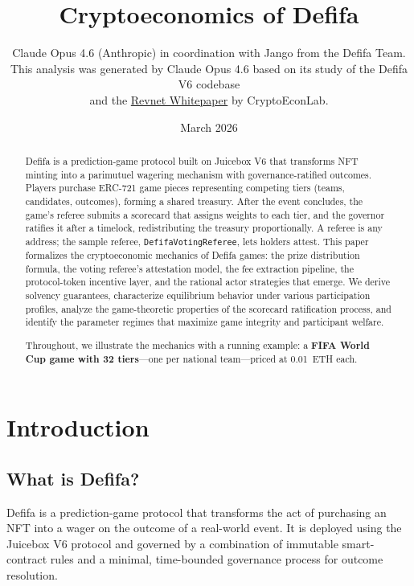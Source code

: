 \documentclass[11pt,a4paper]{article}
\title{\textbf{Cryptoeconomics of Defifa}}
\author{Claude Opus 4.6 (Anthropic) in coordination with Jango from the Defifa Team.\\[4pt]
\small This analysis was generated by Claude Opus 4.6 based on its study of the Defifa V6 codebase\\
\small and the \href{https://cryptoeconlab.com/paper/pub-0?paper=https\%253A\%252F\%252Fstorage.googleapis.com\%252Fcel-public-resources\%252FRevnet-Whitepaper.pdf}{Revnet Whitepaper} by CryptoEconLab.}
\date{March 2026}
\begin{document}
\maketitle

\begin{abstract}
Defifa is a prediction-game protocol built on Juicebox V6 that transforms NFT minting into a parimutuel wagering mechanism with governance-ratified outcomes. Players purchase ERC-721 game pieces representing competing tiers (teams, candidates, outcomes), forming a shared treasury. After the event concludes, the game's referee submits a scorecard that assigns weights to each tier, and the governor ratifies it after a timelock, redistributing the treasury proportionally. A referee is any address; the sample referee, \texttt{DefifaVotingReferee}, lets holders attest. This paper formalizes the cryptoeconomic mechanics of Defifa games: the prize distribution formula, the voting referee's attestation model, the fee extraction pipeline, the protocol-token incentive layer, and the rational actor strategies that emerge. We derive solvency guarantees, characterize equilibrium behavior under various participation profiles, analyze the game-theoretic properties of the scorecard ratification process, and identify the parameter regimes that maximize game integrity and participant welfare.

Throughout, we illustrate the mechanics with a running example: a \textbf{FIFA World Cup game with 32 tiers}---one per national team---priced at 0.01~ETH each.
\end{abstract}

\tableofcontents
\newpage

\section{Introduction}

\subsection{What is Defifa?}

Defifa is a prediction-game protocol that transforms the act of purchasing an NFT into a wager on the outcome of a real-world event. It is deployed using the Juicebox V6 protocol and governed by a combination of immutable smart-contract rules and a minimal, time-bounded governance process for outcome resolution.
\end{document}
